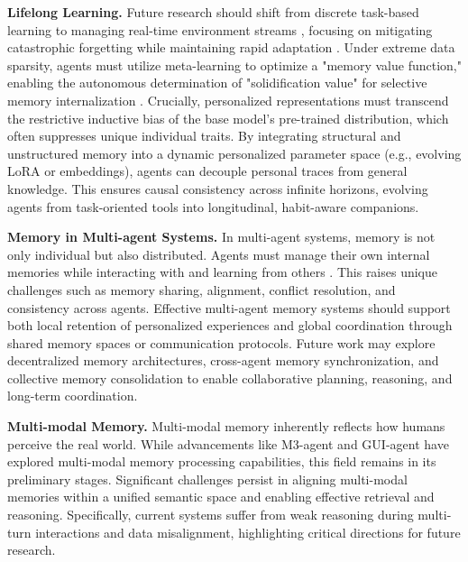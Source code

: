 \documentclass[manuscript,screen]{acmart}
\begin{document}
\par{\textbf{Lifelong Learning.}} Future research should shift from discrete task-based learning to managing real-time environment streams \citep{zhang2025agentic}, focusing on mitigating catastrophic forgetting while maintaining rapid adaptation \citep{feng2024tasl}. Under extreme data sparsity, agents must utilize meta-learning to optimize a "memory value function," enabling the autonomous determination of "solidification value" for selective memory internalization \citep{tian2024forget}. Crucially, personalized representations must transcend the restrictive inductive bias of the base model's pre-trained distribution, which often suppresses unique individual traits. By integrating structural \citep{rasmussen2025zep} and unstructured memory \citep{bae2022keep} into a dynamic personalized parameter space (e.g., evolving LoRA or embeddings), agents can decouple personal traces from general knowledge. This ensures causal consistency across infinite horizons, evolving agents from task-oriented tools into longitudinal, habit-aware companions.

\par{\textbf{Memory in Multi-agent Systems.}} In multi-agent systems, memory is not only individual but also distributed. Agents must manage their own internal memories while interacting with and learning from others \citep{wang2025mirix}. This raises unique challenges such as memory sharing, alignment, conflict resolution, and consistency across agents. Effective multi-agent memory systems should support both local retention of personalized experiences and global coordination through shared memory spaces or communication protocols. Future work may explore decentralized memory architectures, cross-agent memory synchronization, and collective memory consolidation to enable collaborative planning, reasoning, and long-term coordination.

\par{\textbf{Multi-modal Memory.}} Multi-modal memory inherently reflects how humans perceive the real world. While advancements like M3-agent \citep{long2025seeinglisteningrememberingreasoning} and GUI-agent \citep{hong2023cogagent} have explored multi-modal memory processing capabilities, this field remains in its preliminary stages. Significant challenges persist in aligning multi-modal memories within a unified semantic space and enabling effective retrieval and reasoning. Specifically, current systems suffer from weak reasoning during multi-turn interactions and data misalignment, highlighting critical directions for future research.
\end{document}
